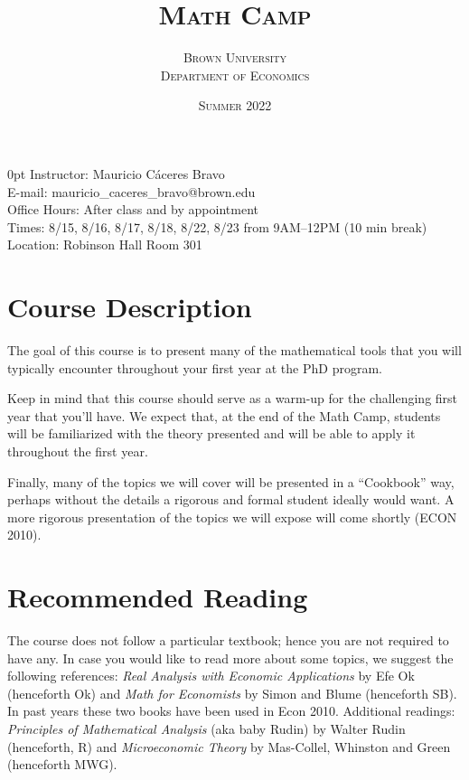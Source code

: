 \documentclass[11pt]{article}
\title{\bfseries\scshape Math Camp}
\author{\scshape Brown University \\ \scshape Department of Economics}
\date{\scshape Summer 2022}
\renewcommand{\displayoptions}{\maketitle\pagenumbering{arabic}}
\begin{document}
\displayoptions

{
  \bfseries
  \begin{adjustwidth}{\parindent}{0pt}
    Instructor: Mauricio C\'aceres Bravo \\
    E-mail: mauricio\_caceres\_bravo@brown.edu \\
    Office Hours: After class and by appointment \\[12pt]
    Times: 8/15, 8/16, 8/17, 8/18, 8/22, 8/23 from 9AM--12PM (10 min break) \\
    Location: Robinson Hall Room 301
  \end{adjustwidth}
  \vspace{12pt}
}

\section{Course Description}
\label{sec:course_description}

The goal of this course is to present many of the mathematical tools that you will typically encounter throughout your first year at the PhD program.

Keep in mind that this course should serve as a warm-up for the challenging first year that you’ll have. We expect that, at the end of the Math Camp, students will be familiarized with the theory presented and will be able to apply it throughout the first year.

Finally, many of the topics we will cover will be presented in a ``Cookbook'' way, perhaps without the details a rigorous and formal student ideally would want. A more rigorous presentation of the topics we will expose will come shortly (ECON 2010).

\section{Recommended Reading}
\label{sec:recommended_reading}

The course does not follow a particular textbook; hence you are not required to have any. In case you would like to read more about some topics, we suggest the following references: \textit{Real Analysis with Economic Applications} by Efe Ok (henceforth Ok) and \textit{Math for Economists} by Simon and Blume (henceforth SB). In past years these two books have been used in Econ 2010. Additional readings: \textit{Principles of Mathematical Analysis} (aka baby Rudin) by Walter Rudin (henceforth, R) and \textit{Microeconomic Theory} by Mas-Collel, Whinston and Green (henceforth MWG).
\end{document}
